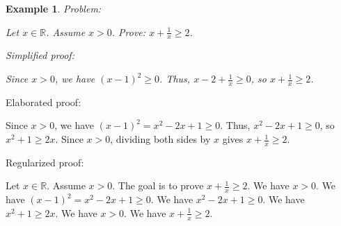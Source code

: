 \documentclass{article}
\newtheorem{example}{Example}
\begin{document}
\begin{example}
Problem:
\begin{tcolorbox}[colback=yellow!10, width=\linewidth]
Let $x\in\mathbb{R}$. Assume $x> 0$. Prove: $x + \frac{1}{x} \ge 2$.
\end{tcolorbox}

Simplified proof:
\begin{tcolorbox}[colback=blue!10, width=\linewidth]
Since $x>0$, we have $(x-1)^2 \ge 0$. Thus, $x - 2 + \frac{1}{x} \ge 0$, so $x + \frac{1}{x} \ge 2$.
\end{tcolorbox}
\end{example}

Elaborated proof:
\begin{tcolorbox}[colback=green!10, width=\linewidth]
Since $x>0$, we have $(x-1)^2 = x^2 - 2x + 1 \ge 0$. Thus, $x^2 - 2x + 1 \ge 0$, so $x^2 + 1 \ge 2x$. Since $x > 0$, dividing both sides by $x$ gives $x + \frac{1}{x} \ge 2$.
\end{tcolorbox}

Regularized proof:
\begin{tcolorbox}[colback=red!10, width=\linewidth]
Let $x\in\mathbb{R}$.
Assume $x>0$.
The goal is to prove $x + \frac{1}{x} \ge 2$.
We have $x>0$.
We have ${{(x-1)}}^2 = x^2 - 2x + 1 \ge 0$.
We have $x^2 - 2x + 1 \ge 0$.
We have $x^2 + 1 \ge 2x$.
We have $x > 0$.
We have $x + \frac{1}{x} \ge 2$.
\end{tcolorbox}
\end{document}
